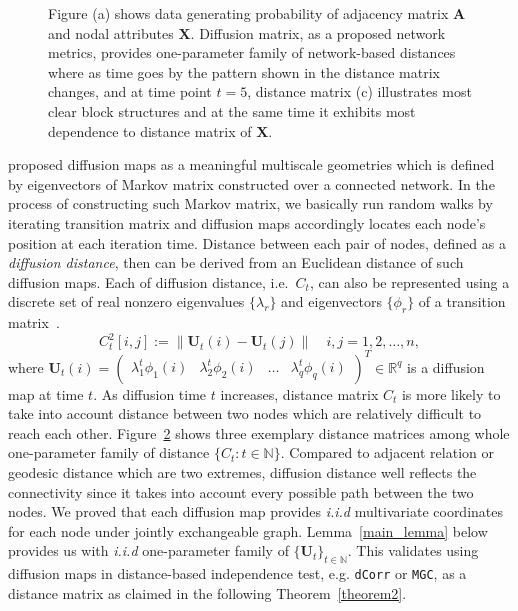 \documentclass[11pt]{article}
\theoremstyle{definition}
\begin{document}
\begin{figure}[h]
\begin{subfigure}[b]{0.23\textwidth}
		\caption{}
		\label{fig:d}
	\end{subfigure}
	\caption{Figure (a) shows data generating probability of adjacency matrix $\mathbf{A}$ and nodal attributes $\mathbf{X}$. Diffusion matrix, as a proposed network metrics, provides one-parameter family of network-based distances where as time goes by the pattern shown in the distance matrix changes, and at time point $t = 5$, distance matrix (c) illustrates most clear block structures and at the same time it exhibits most dependence to distance matrix of $\mathbf{X}$.}
	\label{fig:diffusions}
\end{figure}
\cite{coifman2006diffusion} proposed diffusion maps as a meaningful multiscale geometries which is defined by eigenvectors of Markov matrix constructed over a connected network. In the process of constructing such Markov matrix, we basically run random walks by iterating transition matrix and diffusion maps accordingly locates each node's position at each iteration time. Distance between each pair of nodes, defined as a \textit{diffusion distance}, then can be derived from an Euclidean distance of such diffusion maps. Each of diffusion distance, i.e.~$C_{t}$, can also be represented using a discrete set of real nonzero eigenvalues $\{ \lambda_{r} \}$ and eigenvectors $\{ \phi_{r}  \}$ of a transition matrix~\citep{coifman2006diffusion,lafon2006diffusion}. 
\begin{equation}
\label{eq:diffusion}
C^2_{t}[i,j]  :=   \parallel \mathbf{U}_{t}(i) - \mathbf{U}_{t}(j) \parallel   \quad i,j = 1,2, \ldots , n,
\end{equation}
where $\mathbf{U}_{t}(i) = \begin{pmatrix} \lambda^{t}_{1} \phi_{1}(i) & \lambda^{t}_{2} \phi_{2} (i)  & \ldots & \lambda^{t}_{q} \phi_{q}(i) \end{pmatrix}^{T} \in \mathbb{R}^{q}$ is a diffusion map at time $t$. As diffusion time $t$ increases, distance matrix $C_{t}$ is more likely to take into account distance between two nodes which are relatively difficult to reach each other. Figure~\ref{fig:diffusions} shows three exemplary distance matrices among whole one-parameter family of distance $\{ C_{t} : t \in \mathbb{N} \}$. Compared to adjacent relation or geodesic distance which are two extremes, diffusion distance well reflects the connectivity since it takes into account every possible path between the two nodes. We proved that each diffusion map provides \textit{i.i.d} multivariate coordinates for each node under jointly exchangeable graph. Lemma~\ref{main_lemma} below provides us with \textit{i.i.d} one-parameter family of $\{ \mathbf{U}_{t} \}_{t \in \mathbb{N}}$. This validates using diffusion maps in distance-based independence test, e.g. \texttt{dCorr} or \texttt{MGC}, as a distance matrix as claimed in the following Theorem~\ref{theorem2}. 
\end{document}
